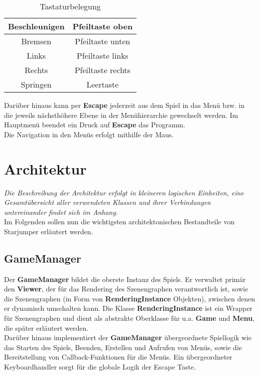 \documentclass{llncs}
\begin{document}
\begin{table}[H]
	\begin{center}
		\begin{tabular}{|c|c|}
			\hline
			Beschleunigen & Pfeiltaste oben \\
			\hline
			Bremsen & Pfeiltaste unten \\
			\hline
			Links & Pfeiltaste links \\
			\hline
			Rechts & Pfeiltaste rechts \\
			\hline
			Springen & Leertaste \\
			\hline
		\end{tabular}
	\end{center}
	\caption{Tastaturbelegung}
\end{table}
\noindent Dar\"uber hinaus kann per \textbf{Escape} jederzeit aus dem Spiel in das Men\"u
bzw. in die jeweils n\"achsth\"ohere Ebene in der Men\"uhierarchie gewechselt werden. Im
Hauptmen\"u beendet ein Druck auf \textbf{Escape} das Programm.\\
Die Navigation in den Men\"us erfolgt mithilfe der Maus.


\section{Architektur}

\textit{Die Beschreibung der Architektur erfolgt in kleineren logischen Einheiten, eine Gesamt\"ubersicht
aller verwendeten Klassen und ihrer Verbindungen untereinander findet sich im Anhang.}\\
Im Folgenden sollen nun die wichtigsten architektonischen Bestandteile von Starjumper
erl\"autert werden. 

\subsection{GameManager}
Der \textbf{GameManager} bildet die oberste Instanz des Spiels. Er verwaltet prim\"ar den \textbf{Viewer}, der f\"ur das
Rendering des Szenengraphen verantwortlich ist, sowie die Szenengraphen (in Form von \textbf{RenderingInstance}
Objekten), zwischen denen er dynamisch umschalten kann. Die Klasse \textbf{RenderingInstance} ist ein
Wrapper f\"ur Szenengraphen und dient als abstrakte Oberklasse f\"ur u.a. \textbf{Game} und \textbf{Menu}, die
sp\"ater erl\"autert werden.\\
Dar\"uber hinaus implementiert der \textbf{GameManager} \"ubergeordnete Spiellogik wie das Starten des Spiels,
Beenden, Erstellen und Aufrufen von Men\"us, sowie die Bereitstellung von Callback-Funktionen f\"ur
die Men\"us. Ein \"ubergeordneter Keyboardhandler sorgt f\"ur die globale Logik der Escape Taste.
\end{document}
